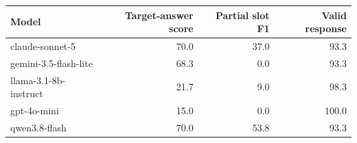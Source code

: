 \begin{tabular}{lrrr}
\toprule
Model & Target-answer score & Partial slot F1 & Valid response \\
\midrule
claude-sonnet-5 & 70.0 & 37.0 & 93.3 \\
gemini-3.5-flash-lite & 68.3 & 0.0 & 93.3 \\
llama-3.1-8b-instruct & 21.7 & 9.0 & 98.3 \\
gpt-4o-mini & 15.0 & 0.0 & 100.0 \\
qwen3.8-flash & 70.0 & 53.8 & 93.3 \\
\bottomrule
\end{tabular}
